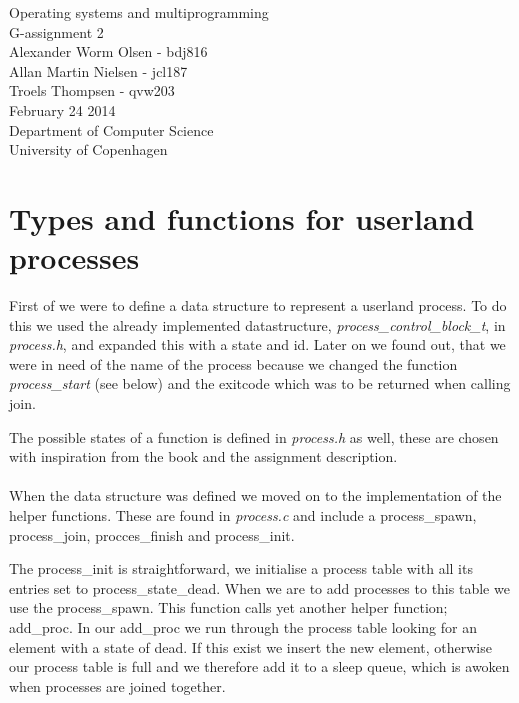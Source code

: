 \documentclass[12pt,a4paper,danish]{article}
\begin{document}
\begin{titlepage}
    \vspace*{\fill}
    \begin{center}
      {\Huge Operating systems and multiprogramming}\\[0.7cm]
      {\huge G-assignment 2}\\[0.7cm]
      {\large Alexander Worm Olsen - bdj816}\\[0.4cm]
      {\large Allan Martin Nielsen - jcl187}\\[0.4cm]
      {\large Troels Thompsen - qvw203}\\[0.4cm]
      {\small February 24 2014}\\[0.3cm] 
      {\small Department of Computer Science}\\
      {\small University of Copenhagen}
    \end{center}
    \vspace*{\fill}
\end{titlepage}

\section{Types and functions for userland processes}
First of we were to define a data structure to represent a userland process. To do this we used the already implemented datastructure, \textit{process\_control\_block\_t}, in \textit{process.h}, and expanded this with a state and id. Later on we found out, that we were in need of the name of the process because we changed the function \textit{process\_start} (see below) and the exitcode which was to be returned when calling join.

The possible states of a function is defined in \textit{process.h} as well, these are chosen with inspiration from the book and the assignment description.\\\\
When the data structure was defined we moved on to the implementation of the helper functions. These are found in \textit{process.c} and include a process\_spawn, process\_join, procces\_finish and process\_init. 

The process\_init is straightforward, we initialise a process table with all its entries set to process\_state\_dead. When we are to add processes to this table we use the process\_spawn. This function calls yet another helper function; add\_proc. In our add\_proc we run through the process table looking for an element with a state of dead. If this exist we insert the new element, otherwise our process table is full and we therefore add it to a sleep queue, which is awoken when processes are joined together.
\end{document}
